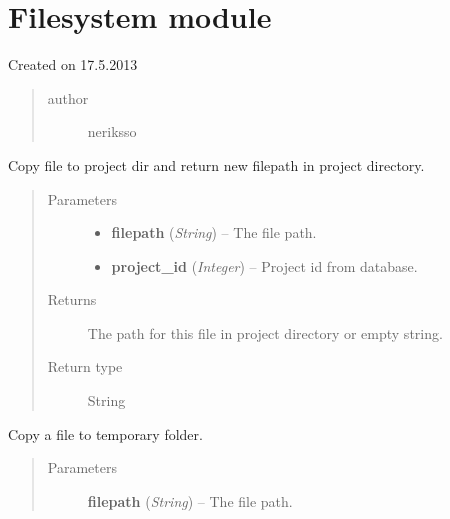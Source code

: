 \documentclass[letterpaper,10pt,english]{sphinxmanual}
\begin{document}
\section{Filesystem module}
\label{filesystem:module-filesystem}\label{filesystem::doc}\label{filesystem:filesystem-module}
Created on 17.5.2013
\begin{quote}\begin{description}
\item[{author}] \leavevmode
neriksso

\end{description}\end{quote}

\begin{fulllineitems}
\label{filesystem:filesystem.copy_file_to_project}
Copy file to project dir and return new filepath in project directory.
\begin{quote}\begin{description}
\item[{Parameters}] \leavevmode\begin{itemize}
\item {} 
\textbf{filepath} (\emph{String}) -- The file path.

\item {} 
\textbf{project\_id} (\emph{Integer}) -- Project id from database.

\end{itemize}

\item[{Returns}] \leavevmode
The path for this file in project directory or empty string.

\item[{Return type}] \leavevmode
String

\end{description}\end{quote}

\end{fulllineitems}


\begin{fulllineitems}
\label{filesystem:filesystem.copy_to_temporary_directory}
Copy a file to temporary folder.
\begin{quote}\begin{description}
\item[{Parameters}] \leavevmode
\textbf{filepath} (\emph{String}) -- The file path.

\end{description}\end{quote}

\end{fulllineitems}
\end{document}

